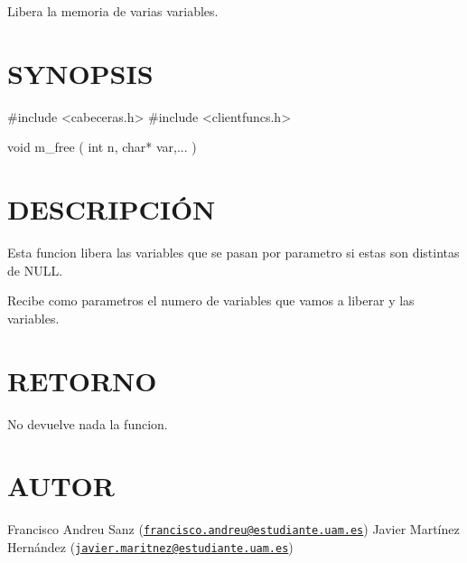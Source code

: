 Libera la memoria de varias variables.\hypertarget{ServerReply_SYNOPSIS}{}\section{S\-Y\-N\-O\-P\-S\-I\-S}\label{ServerReply_SYNOPSIS}
\begin{DoxyVerb} #include  <cabeceras.h>
   #include  <clientfuncs.h>

 void m_free ( int n,  char* var,... )
\end{DoxyVerb}
\hypertarget{ServerReply_descripcion}{}\section{D\-E\-S\-C\-R\-I\-P\-C\-IÓ\-N}\label{ServerReply_descripcion}
Esta funcion libera las variables que se pasan por parametro si estas son distintas de N\-U\-L\-L.

Recibe como parametros el numero de variables que vamos a liberar y las variables.\hypertarget{ServerReply_retorno}{}\section{R\-E\-T\-O\-R\-N\-O}\label{ServerReply_retorno}
No devuelve nada la funcion.\hypertarget{ServerReply_authors}{}\section{A\-U\-T\-O\-R}\label{ServerReply_authors}
Francisco Andreu Sanz (\href{mailto:francisco.andreu@estudiante.uam.es}{\tt francisco.\-andreu@estudiante.\-uam.\-es}) Javier Martínez Hernández (\href{mailto:javier.maritnez@estudiante.uam.es}{\tt javier.\-maritnez@estudiante.\-uam.\-es}) 

 